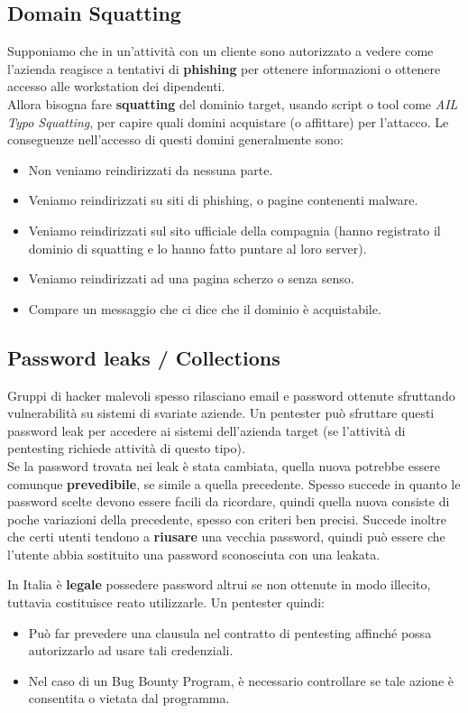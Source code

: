 \documentclass{article}
\begin{document}
\subsection{Domain Squatting}
Supponiamo che in un'attività con un cliente sono autorizzato a vedere come l'azienda reagisce a tentativi di \textbf{phishing} per ottenere informazioni o ottenere accesso alle workstation dei dipendenti.\\ Allora bisogna fare \textbf{squatting} del dominio target, usando script o tool come \textit{AIL Typo Squatting}, per capire quali domini acquistare (o affittare) per l'attacco.
\newpage
Le conseguenze nell'accesso di questi domini generalmente sono:
\begin{itemize}
    \item Non veniamo reindirizzati da nessuna parte.
    \item Veniamo reindirizzati su siti di phishing, o pagine contenenti malware.
    \item Veniamo reindirizzati sul sito ufficiale della compagnia (hanno registrato il dominio di squatting e lo hanno fatto puntare al loro server).
    \item Veniamo reindirizzati ad una pagina scherzo o senza senso.
    \item Compare un messaggio che ci dice che il dominio è acquistabile.
\end{itemize}

\subsection{Password leaks / Collections}
Gruppi di hacker malevoli spesso rilasciano email e password ottenute sfruttando vulnerabilità su sistemi di svariate aziende.
Un pentester può sfruttare questi password leak per accedere ai sistemi dell'azienda target (se l'attività di pentesting richiede attività di questo tipo). \\
Se la password trovata nei leak è stata cambiata, quella nuova potrebbe essere comunque \textbf{prevedibile}, se simile a quella precedente. Spesso succede in quanto le password scelte devono essere facili da ricordare, quindi quella nuova consiste di poche variazioni della precedente, spesso con criteri ben precisi. 
Succede inoltre che certi utenti tendono a \textbf{riusare} una vecchia password, quindi può essere che l'utente abbia sostituito una password sconosciuta con una leakata.

In Italia è \textbf{legale} possedere password altrui se non ottenute in modo illecito, tuttavia costituisce reato utilizzarle.
Un pentester quindi:
\begin{itemize}
    \item Può far prevedere una clausula nel contratto di pentesting affinché possa autorizzarlo ad usare tali credenziali.
    \item Nel caso di un Bug Bounty Program, è necessario controllare se tale azione è consentita o vietata dal programma.
\end{itemize}
\end{document}
